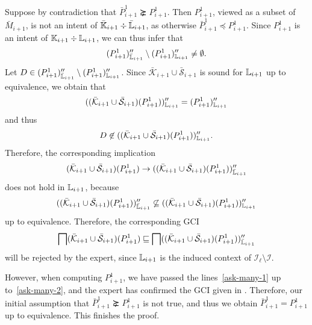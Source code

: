 \begin{Proof}
  Suppose by contradiction that $\bar P_{i+1}^{1} \succneq P_{i+1}^{1}$.  Then
  $P_{i+1}^{1}$, viewed as a subset of $\bar M_{i+1}$, is not an intent of $\bar{{\mathbb{K}}}_{i+1} \div \bar{{\mathbb{L}}}_{i+1}$, as otherwise $\bar P_{i+1}^{1} \preceq
  P_{i+1}^{1}$.  Since $P_{i+1}^{1}$ is an intent of ${\mathbb{K}}_{i+1} \div {\ensuremath{\mathbb{L}}}_{i+1}$, we
  can thus infer that
  \begin{equation*}
    (P_{i+1}^{1})_{\bar{{\mathbb{L}}}_{i+1}}'' \setminus (P_{i+1}^{1})_{{\mathbb{L}}_{i+1}}'' \neq \emptyset.
  \end{equation*}
  Let $D \in (P_{i+1}^{1})_{\bar{{\mathbb{L}}}_{i+1}}'' \setminus (P_{i+1}^{1})_{{\mathbb{L}}_{i+1}}''$.  Since $\bar{\mathcal{K}}_{i+1} \cup \bar{\mathcal{S}}_{i+1}$ is sound
  for ${\mathbb{L}}_{i+1}$ up to equivalence, we obtain that
  \begin{equation*}
    ((\bar{\mathcal{K}}_{i+1} \cup \bar{\mathcal{S}}_{i+1})(P_{i+1}^{1}))_{{\mathbb{L}}_{i+1}}''
    = (P_{i+1}^{1})_{{\mathbb{L}}_{i+1}}''
  \end{equation*}
  and thus
  \begin{equation*}
    D \not\in ((\bar{\mathcal{K}}_{i+1} \cup \bar{\mathcal{S}}_{i+1})(P_{i+1}^{1}))_{{\mathbb{L}}_{i+1}}''.
  \end{equation*}
  Therefore, the corresponding implication
  \begin{equation*}
    (\bar{\mathcal{K}}_{i+1} \cup \bar{\mathcal{S}}_{i+1})(P_{i+1}^{1})
    \to ((\bar{\mathcal{K}}_{i+1} \cup \bar{\mathcal{S}}_{i+1})(P_{i+1}^{1}))_{\bar{{\mathbb{L}}}_{i+1}}''
  \end{equation*}
  does not hold in ${\mathbb{L}}_{i+1}$, because
  \begin{equation*}
    ((\bar{\mathcal{K}}_{i+1} \cup \bar{\mathcal{S}}_{i+1})(P_{i+1}^{1}))_{\bar{{\mathbb{L}}}_{i+1}}''
    \not\subseteq ((\bar{\mathcal{K}}_{i+1} \cup
    \bar{\mathcal{S}}_{i+1})(P_{i+1}^{1}))_{{\mathbb{L}}_{i+1}}''
  \end{equation*}
  up to equivalence.  Therefore, the corresponding GCI
  \begin{equation}
    \label{eq:59}
    \bigsqcap(\bar{\mathcal{K}}_{i+1} \cup \bar{\mathcal{S}}_{i+1})(P_{i+1}^{1})
    \sqsubseteq \bigsqcap ((\bar{\mathcal{K}}_{i+1} \cup
    \bar{\mathcal{S}}_{i+1})(P_{i+1}^{1}))_{\bar{{\mathbb{L}}}_{i+1}}''
  \end{equation}
  will be rejected by the expert, since ${\mathbb{L}}_{i+1}$ is the induced context of
  $\mathcal{I}_{\ell} \setminus \mathcal{I}$.

  However, when computing $P_{i+1}^{1}$, we have passed the lines~\ref{ask-many-1} up
  to~\ref{ask-many-2}, and the expert has confirmed the GCI given in
  . Therefore, our initial assumption that $\bar P_{i+1}^{1} \succneq
  P_{i+1}^{1}$ is not true, and thus we obtain $\bar P_{i+1}^{1} = P_{i+1}^{1}$ up to
  equivalence.  This finishes the proof.
\end{Proof}


